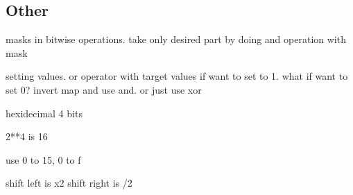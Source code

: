 
\subsection{Other}


masks in bitwise operations. take only desired part by doing and operation with mask

setting values. or operator with target values if want to set to 1.
what if want to set 0? invert map and use and. or just use xor


hexidecimal
4 bits

2**4 is 16

use 0 to 15, 0 to f

shift left is x2
shift right is /2




